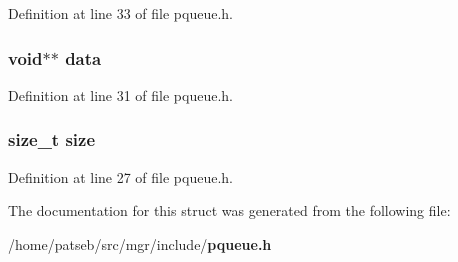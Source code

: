 Definition at line 33 of file pqueue.\-h.

\subsubsection[{data}]{\setlength{\rightskip}{0pt plus 5cm}void$\ast$$\ast$ {\bf data}}\label{struct_p_queue__s_af00cdd742d205932a8309628d39efd5e}


Definition at line 31 of file pqueue.\-h.

\subsubsection[{size}]{\setlength{\rightskip}{0pt plus 5cm}size\-\_\-t {\bf size}}\label{struct_p_queue__s_a854352f53b148adc24983a58a1866d66}


Definition at line 27 of file pqueue.\-h.



The documentation for this struct was generated from the following file\-:\begin{DoxyCompactItemize}
\item 
/home/patseb/src/mgr/include/{\bf pqueue.\-h}\end{DoxyCompactItemize}
